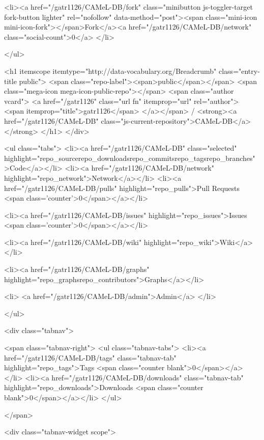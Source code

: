              <li><a href="/gatr1126/CAMeL-DB/fork" class="minibutton js-toggler-target fork-button lighter" rel="nofollow" data-method="post"><span class="mini-icon mini-icon-fork"></span>Fork</a><a href="/gatr1126/CAMeL-DB/network" class="social-count">0</a>
              </li>


    </ul>

              <h1 itemscope itemtype="http://data-vocabulary.org/Breadcrumb" class="entry-title public">
                <span class="repo-label"><span>public</span></span>
                <span class="mega-icon mega-icon-public-repo"></span>
                <span class="author vcard">
                  <a href="/gatr1126" class="url fn" itemprop="url" rel="author">
                  <span itemprop="title">gatr1126</span>
                  </a></span> /
                <strong><a href="/gatr1126/CAMeL-DB" class="js-current-repository">CAMeL-DB</a></strong>
              </h1>
            </div>

            

  <ul class="tabs">
    <li><a href="/gatr1126/CAMeL-DB" class="selected" highlight="repo_sourcerepo_downloadsrepo_commitsrepo_tagsrepo_branches">Code</a></li>
    <li><a href="/gatr1126/CAMeL-DB/network" highlight="repo_network">Network</a></li>
    <li><a href="/gatr1126/CAMeL-DB/pulls" highlight="repo_pulls">Pull Requests <span class='counter'>0</span></a></li>

      <li><a href="/gatr1126/CAMeL-DB/issues" highlight="repo_issues">Issues <span class='counter'>0</span></a></li>

      <li><a href="/gatr1126/CAMeL-DB/wiki" highlight="repo_wiki">Wiki</a></li>


    <li><a href="/gatr1126/CAMeL-DB/graphs" highlight="repo_graphsrepo_contributors">Graphs</a></li>

      <li>
        <a href="/gatr1126/CAMeL-DB/admin">Admin</a>
      </li>

  </ul>
  
<div class="tabnav">

  <span class="tabnav-right">
    <ul class="tabnav-tabs">
      <li><a href="/gatr1126/CAMeL-DB/tags" class="tabnav-tab" highlight="repo_tags">Tags <span class="counter blank">0</span></a></li>
      <li><a href="/gatr1126/CAMeL-DB/downloads" class="tabnav-tab" highlight="repo_downloads">Downloads <span class="counter blank">0</span></a></li>
    </ul>
    
  </span>

  <div class="tabnav-widget scope">


